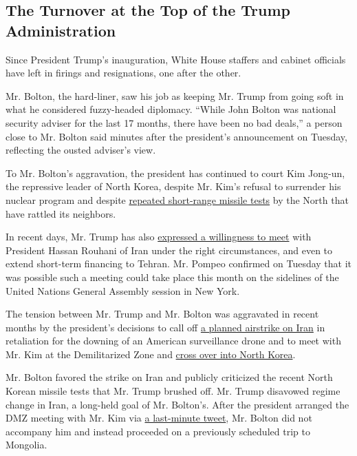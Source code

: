 \hypertarget{the-turnover-at-the-top-of-the-trump-administration}{%
\subsection{The Turnover at the Top of the Trump
Administration}\label{the-turnover-at-the-top-of-the-trump-administration}}

Since President Trump's inauguration, White House staffers and cabinet
officials have left in firings and resignations, one after the other.

Mr. Bolton, the hard-liner, saw his job as keeping Mr. Trump from going
soft in what he considered fuzzy-headed diplomacy. ``While John Bolton
was national security adviser for the last 17 months, there have been no
bad deals,'' a person close to Mr. Bolton said minutes after the
president's announcement on Tuesday, reflecting the ousted adviser's
view.

To Mr. Bolton's aggravation, the president has continued to court Kim
Jong-un, the repressive leader of North Korea, despite Mr. Kim's refusal
to surrender his nuclear program and despite
\href{https://www.nytimes.com/2019/07/30/world/asia/north-korea-projectiles.html}{repeated
short-range missile tests} by the North that have rattled its neighbors.

In recent days, Mr. Trump has also
\href{https://www.nytimes.com/2019/08/26/world/europe/g7-trump-china-trade-war.html}{expressed
a willingness to meet} with President Hassan Rouhani of Iran under the
right circumstances, and even to extend short-term financing to Tehran.
Mr. Pompeo confirmed on Tuesday that it was possible such a meeting
could take place this month on the sidelines of the United Nations
General Assembly session in New York.

The tension between Mr. Trump and Mr. Bolton was aggravated in recent
months by the president's decisions to call off
\href{https://www.nytimes.com/2019/06/20/world/middleeast/iran-us-drone.html}{a
planned airstrike on Iran} in retaliation for the downing of an American
surveillance drone and to meet with Mr. Kim at the Demilitarized Zone
and
\href{https://www.nytimes.com/2019/06/30/world/asia/trump-north-korea-dmz.html}{cross
over into North Korea}.

Mr. Bolton favored the strike on Iran and publicly criticized the recent
North Korean missile tests that Mr. Trump brushed off. Mr. Trump
disavowed regime change in Iran, a long-held goal of Mr. Bolton's. After
the president arranged the DMZ meeting with Mr. Kim via
\href{https://twitter.com/realDonaldTrump/status/1144740178948493314}{a
last-minute tweet}, Mr. Bolton did not accompany him and instead
proceeded on a previously scheduled trip to Mongolia.

